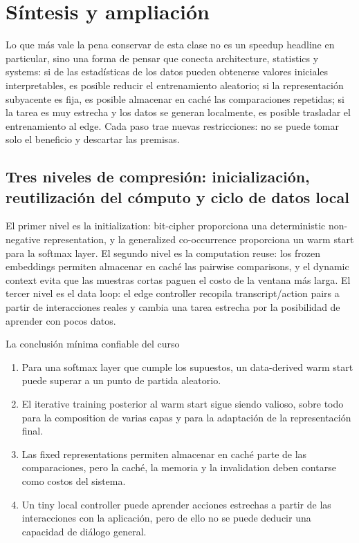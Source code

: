 \section{Síntesis y ampliación}

Lo que más vale la pena conservar de esta clase no es un speedup headline en particular, sino una forma de pensar que conecta architecture, statistics y systems: si de las estadísticas de los datos pueden obtenerse valores iniciales interpretables, es posible reducir el entrenamiento aleatorio; si la representación subyacente es fija, es posible almacenar en caché las comparaciones repetidas; si la tarea es muy estrecha y los datos se generan localmente, es posible trasladar el entrenamiento al edge. Cada paso trae nuevas restricciones: no se puede tomar solo el beneficio y descartar las premisas.

\subsection{Tres niveles de compresión: inicialización, reutilización del cómputo y ciclo de datos local}

El primer nivel es la initialization: bit-cipher proporciona una deterministic non-negative representation, y la generalized co-occurrence proporciona un warm start para la softmax layer. El segundo nivel es la computation reuse: los frozen embeddings permiten almacenar en caché las pairwise comparisons, y el dynamic context evita que las muestras cortas paguen el costo de la ventana más larga. El tercer nivel es el data loop: el edge controller recopila transcript/action pairs a partir de interacciones reales y cambia una tarea estrecha por la posibilidad de aprender con pocos datos.

\begin{importantbox}{La conclusión mínima confiable del curso}
\begin{enumerate}
  \item Para una softmax layer que cumple los supuestos, un data-derived warm start puede superar a un punto de partida aleatorio.
  \item El iterative training posterior al warm start sigue siendo valioso, sobre todo para la composition de varias capas y para la adaptación de la representación final.
  \item Las fixed representations permiten almacenar en caché parte de las comparaciones, pero la caché, la memoria y la invalidation deben contarse como costos del sistema.
  \item Un tiny local controller puede aprender acciones estrechas a partir de las interacciones con la aplicación, pero de ello no se puede deducir una capacidad de diálogo general.
\end{enumerate}
\end{importantbox}

